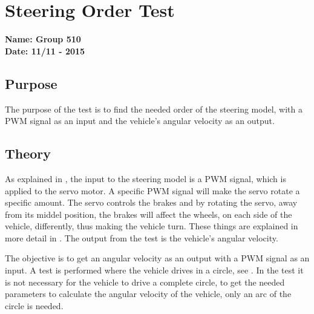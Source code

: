 \pagebreak
\section{Steering Order Test} \label{app:steeringOrderTest}
\textbf{Name: Group 510}\\
\textbf{Date: 11/11 - 2015}

\subsection{Purpose}
The purpose of the test is to find the needed order of the steering model, with a PWM signal as an input and the vehicle's angular velocity as an output.

\subsection{Theory}
As explained in , the input to the steering model is a PWM signal, which is applied to the servo motor. A specific PWM signal will make the servo rotate a specific amount. The servo controls the brakes and by rotating the servo, away from its middel position, the brakes will affect the wheels, on each side of the vehicle, differently, thus making the vehicle turn. These things are explained in more detail in . The output from the test is the vehicle's angular velocity.

The objective is to get an angular velocity as an output with a PWM signal as an input. A test is performed where the vehicle drives in a circle, see . In the test it is not necessary for the vehicle to drive a complete circle, to get the needed parameters to calculate the angular velocity of the vehicle, only an arc of the circle is needed.

